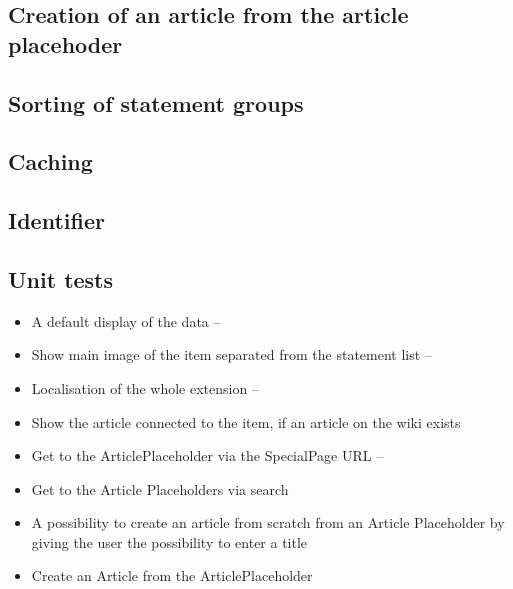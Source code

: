 \documentclass[11pt]{article}
\begin{document}
\subsection{Creation of an article from the article placehoder}


%

\subsection{Sorting of statement groups}

%

\subsection{Caching}

\subsection {Identifier}

\subsection {Unit tests}



\begin{itemize}
\item A default display of the data -- 
\item Show main image of the item separated from the statement list -- 
\item Localisation of the whole extension -- 
\item Show the article connected to the item, if an article on the wiki exists
\item Get to the ArticlePlaceholder via the SpecialPage URL --
\item Get to the Article Placeholders via search
\item A possibility to create an article from scratch from an Article Placeholder by giving the user the possibility to enter a title

\item Create an Article from the ArticlePlaceholder
\end{itemize} 

\newpage
 

\end{document}
